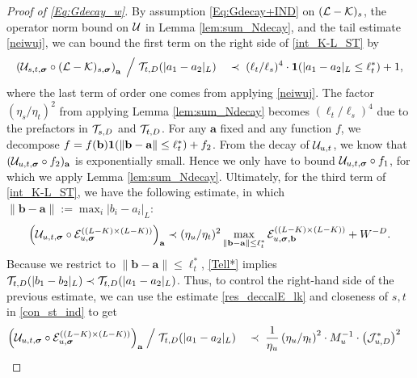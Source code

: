 \begin{proof}[Proof of \eqref{Eq:Gdecay_w}]
By  assumption \eqref{Eq:Gdecay+IND} on $({ \cal L-\cal K})_s$, the operator norm bound on $\cal U$ in Lemma \ref{lem:sum_Ndecay},  and the  tail estimate  \eqref{neiwuj}, 
we can  bound the first term on the right side  of \eqref{int_K-L_ST} by 
\begin{equation} \label{res_deccalE_0}
\left(\mathcal{U}_{s, t, \boldsymbol{\sigma}} \circ (\mathcal{L} - \mathcal{K})_{s, \boldsymbol{\sigma}}\right)_{\textbf{a}}\;\Big/\; 
  {\cal T}_{t, D}(|a_1-a_2|_{L}) \quad 
  \prec \;   (\ell_t/\ell_s)^{4}\cdot {\bf 1}(|a_1-a_2|_{L}\le \ell_t^*) + 1,
\end{equation}
where the last term of order one comes from applying \eqref{neiwuj}. The factor $\left(\eta_s / \eta_t\right)^2$  from applying Lemma \ref{lem:sum_Ndecay} becomes 
$ (\ell_t/\ell_s)^{4}$ due to the prefactors in $ {\cal T}_{s, D}$ and  ${\cal T}_{t, D}$.
For  any $\textbf{a}$ fixed and any function $f$,  we decompose $f  = f (\textbf{b}) {\bf 1} ( \| \textbf{b}-\textbf{a}\|\le \ell_t^*)  + f_2   $. 
From the decay of ${\cal U}_{u,t}$,  we know that $( {\cal U}_{u,t, \boldsymbol{\sigma}} \circ f_2 )_\textbf{a}$ is exponentially small.  
Hence we only have to bound $  {\cal U}_{u,t, \boldsymbol{\sigma}} \circ f_1$, for which we apply  Lemma \ref{lem:sum_Ndecay}. Ultimately, for the third  term of \eqref{int_K-L_ST}, we have the following estimate, in which $\|\textbf{b}-\textbf{a}\|:=\max_{i}|b_{i}-a_{i}|_{L}$:
$$
 \Big({\cal U}_{u,t, \boldsymbol{\sigma}}\circ  {\cal E}^{( (L-K)\times(L-K) )}_{u, \boldsymbol{\sigma}}\Big)_\textbf{a}
 \prec (\eta_u/\eta_t)^2 \max_{\| \textbf{b}-\textbf{a}\|\le \ell_t^*}{\cal E}^{( (L-K)\times(L-K) )}_{u, \boldsymbol{\sigma}, \textbf{b}}+W^{-D}.
$$
Because we restrict to $\|\textbf{b}-\textbf{a}\|\leq\ell_{t}^{*}$, \eqref{Tell*} implies $ {\cal T}_{t, D}(|b_1-b_2|_{L})\prec  {\cal T}_{t, D}(|a_1-a_2|_{L})$. Thus, to control the right-hand side of the previous estimate, we can use the estimate \eqref{res_deccalE_lk} and closeness of $s,t$ in \eqref{con_st_ind} to get 
\begin{align} 
\label{res_deccalE_1}
     \Big({\cal U}_{u,t, \boldsymbol{\sigma}}\circ  {\cal E}^{( (L-K)\times(L-K) )}_{u, \boldsymbol{\sigma}}\Big)_\textbf{a}\;\Big/\; 
 {\cal T}_{t, D}(|a_1-a_2|_{L}) \quad 
  & \prec \; 
  \frac{1}{\eta_u}\left(\eta_u / \eta_t\right)^2 
   \cdot  
   M_{u}^{-1 }
    \cdot 
\left({\cal J}^*_{u,D}\right)^2
\end{align} 

\end{proof}
